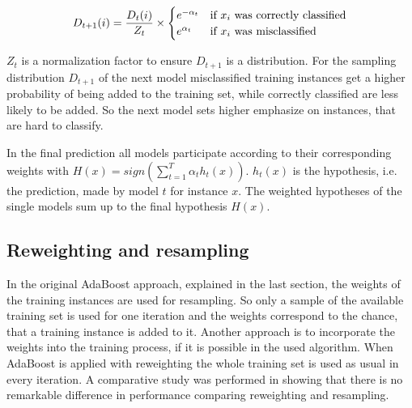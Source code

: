 \documentclass[10pt]{reportMaster}
\begin{document}
\begin{equation}
\label{eq:adaBootsWeightUpdate}
D_{t+1}(i) = \frac{D_t(i)}{Z_t} \times 
\begin{cases}
e^{-\alpha_t} & \text{if $ x_i $ was correctly classified} \\ 
e^{\alpha_t} & \text{if $ x_i $ was misclassified}
\end{cases}
\end{equation}

$Z_t$ is a normalization factor to ensure $D_{t+1}$ is a distribution.
For the sampling distribution $D_{t+1}$ of the next model misclassified training instances get a higher probability of being added to the training set, while correctly classified are less likely to be added.
So the next model sets higher emphasize on instances, that are hard to classify.

In the final prediction all models participate according to their corresponding weights with $H(x) = sign(\sum_{t = 1}^T\alpha_th_t(x))$.
$h_t(x)$ is the hypothesis, i.e. the prediction, made by model $t$ for instance $x$.
The weighted hypotheses of the single models sum up to the final hypothesis $H(x)$. 


\subsection{Reweighting and resampling}
\label{sec:reweightingResampling}
In the original AdaBoost approach, explained in the last section, the weights of the training instances are used for resampling.
So only a sample of the available training set is used for one iteration and the weights correspond to the chance, that a training instance is added to it.
Another approach is to incorporate the weights into the training process, if it is possible in the used algorithm.
When AdaBoost is applied with reweighting the whole training set is used as usual in every iteration.
A comparative study was performed in \cite{resamplingReweighting} showing that there is no remarkable difference in performance comparing reweighting and resampling.
\end{document}
